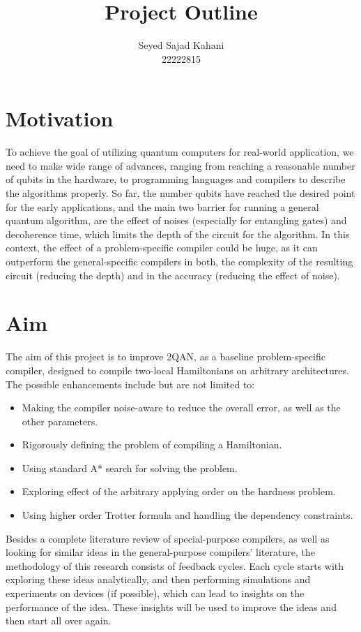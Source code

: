 \documentclass{article}
\title{Project Outline}
\author{Seyed Sajad Kahani \\ 22222815}
\begin{document}
  \maketitle
  \section{Motivation}

To achieve the goal of utilizing quantum computers for real-world application, we need to make wide range of advances, ranging from reaching a reasonable number of qubits in the hardware, to programming languages and compilers to describe the algorithms properly. So far, the number qubits have reached the desired point for the early applications, and the main two barrier for running a general quantum algorithm, are the effect of noises (especially for entangling gates) and decoherence time, which limits the depth of the circuit for the algorithm.
In this context, the effect of a problem-specific compiler could be huge, as it can outperform the general-specific compilers in both, the complexity of the resulting circuit (reducing the depth) and in the accuracy (reducing the effect of noise).

  \section{Aim}
  
  The aim of this project is to improve 2QAN, as a baseline problem-specific compiler, designed to compile two-local Hamiltonians on arbitrary architectures. The possible enhancements include but are not limited to:

  \begin{itemize}
  \item	Making the compiler noise-aware to reduce the overall error, as well as the other parameters.
  \item	Rigorously defining the problem of compiling a Hamiltonian.
  \item	Using standard A* search for solving the problem.
  \item	Exploring effect of the arbitrary applying order on the hardness problem.
  \item	Using higher order Trotter formula and handling the dependency constraints.
  \end{itemize}
  
  Besides a complete literature review of special-purpose compilers, as well as looking for similar ideas in the general-purpose compilers’ literature, the methodology of this research consists of feedback cycles. Each cycle starts with exploring these ideas analytically, and then performing simulations and experiments on devices (if possible), which can lead to insights on the performance of the idea. These insights will be used to improve the ideas and then start all over again.
\end{document}
